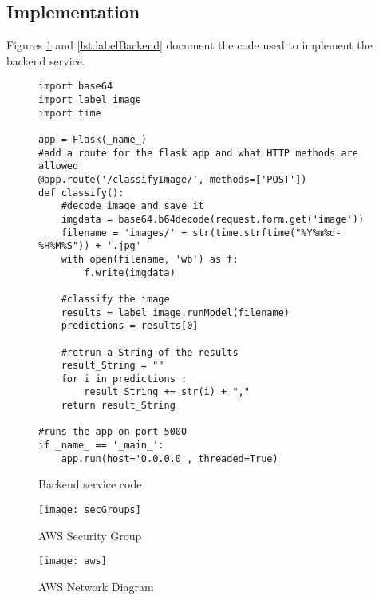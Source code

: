 \tocless\subsection{Implementation}
Figures \ref{lst:backendCode} and \ref{lst:labelBackend} document the code used to implement the backend service.

\begin{figure}[h]
\caption{Backend service code}
\label{lst:backendCode}
\begin{lstlisting}[style=Python]
import base64
import label_image
import time

app = Flask(_name_)
#add a route for the flask app and what HTTP methods are allowed
@app.route('/classifyImage/', methods=['POST'])
def classify():
    #decode image and save it
    imgdata = base64.b64decode(request.form.get('image'))
    filename = 'images/' + str(time.strftime("%Y%m%d-%H%M%S")) + '.jpg'
    with open(filename, 'wb') as f:
        f.write(imgdata)

    #classify the image
    results = label_image.runModel(filename)
    predictions = results[0]

    #retrun a String of the results
    result_String = ""
    for i in predictions :
        result_String += str(i) + ","
    return result_String

#runs the app on port 5000
if _name_ == '_main_':
    app.run(host='0.0.0.0', threaded=True)
\end{lstlisting}
\end{figure}

\begin{figure}[h]
    \centering
    \texttt{[image: secGroups]}
    \caption{AWS Security Group}
    \label{fig:awsSecGroup}
\end{figure}

\begin{figure}[h]
    \centering
    \texttt{[image: aws]}
    \caption{AWS Network Diagram}
    \label{fig:aws}
\end{figure}

